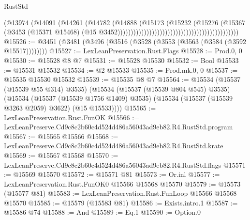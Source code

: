 \begin{lexlean}{RustStd}
\begin{coremodule}
                                                                          (@13974
                                                                            (@14091
                                                                              (@14261
                                                                                (@14782
                                                                                  (@14888
                                                                                    (@15173
                                                                                      (@15232
                                                                                        (@15276
                                                                                          (@15367
                                                                                            (@3453
                                                                                              (@15371
                                                                                                @15468)
                                                                                              (@15
                                                                                                @3452))))))))))))))))))))))))))))))))))))))))))))))
@15526 := @3451 (@3481 (@3496 (@3516 (@3528 (@3553 (@3563 (@3584 (@3592 @15517))))))))
@15527 := LexLeanPreservation.Rust.Flags
@15528 := Prod.{0, 0}
@15530 := @15528 @8 @7
@15531 := @15528 @15530
@15532 := Bool
@15533 := @15531 @15532
@15534 := @2 @15533
@15535 := Prod.mk.{0, 0}
@15537 := @15535 @15530 @15532
@15539 := @15535 @8 @7
@15564 := @15534
    (@15537 (@15539 @55 @314) @3535)
    (@15534
      (@15537 (@15539 @804 @545) @3535)
      (@15534
        (@15537 (@15539 @1756 @1409) @3535)
        (@15534 (@15537 (@15539 @3263 @2059) @3622) (@15 @15533))))
@15565 := LexLeanPreservation.Rust.FunOK
@15566 := LexLeanPreserve.Cd9c8c2b60c4d524d486a56043ad9eb82.R4.RustStd.program
@15567 := @15565 @15566
@15568 := LexLeanPreserve.Cd9c8c2b60c4d524d486a56043ad9eb82.R4.RustStd.krate
@15569 := @15567 @15568
@15570 := LexLeanPreserve.Cd9c8c2b60c4d524d486a56043ad9eb82.R4.RustStd.flags
@15571 := @15569 @15570
@15572 := @15571 @81
@15573 := Or.inl
@15577 := LexLeanPreservation.Rust.FunOK0 @15566 @15568 @15570
@15579 := @15573 (@15577 @81)
@15583 := LexLeanPreservation.Rust.FunLoop @15566 @15568 @15570
@15585 := @15579 (@15583 @81)
@15586 := Exists.intro.{1}
@15587 := @15586 @74
@15588 := And
@15589 := Eq.{1}
@15590 := Option.{0}

\end{coremodule}
\end{lexlean}
